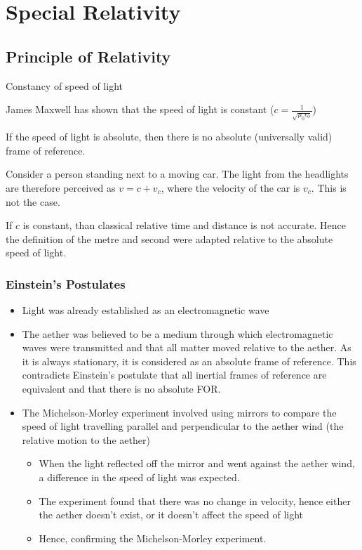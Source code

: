
\chapter{Special Relativity}

\section{Principle of Relativity}

	Constancy of speed of light

	James Maxwell has shown that the speed of light is constant ($c = \frac{1}{\sqrt{\mu_0 \epsilon _0}}$)

	If the speed of light is absolute, then there is no absolute (universally valid) frame of reference.

	Consider a person standing next to a moving car. The light from the headlights are therefore perceived as $v = c + v_c$, where the velocity of the car is $v_c$. This is not the case.

	If $c$ is constant, than classical relative time and distance is not accurate. Hence the definition of the metre and second were adapted relative to the absolute speed of light.

	\subsection{Einstein's Postulates}
	
		\begin{itemize}
			\item Light was already established as an electromagnetic wave
			\item The aether was believed to be a medium through which electromagnetic waves were transmitted and that all matter moved relative to the aether. As it is always stationary, it is considered as an absolute frame of reference. This contradicts Einstein's postulate that all inertial frames of reference are equivalent and that there is no absolute FOR.
			\item The Michelson-Morley experiment involved using mirrors to compare the speed of light travelling parallel and perpendicular to the aether wind (the relative motion to the aether)
				\begin{itemize}
					\item When the light reflected off the mirror and went against the aether wind, a difference in the speed of light was expected.
					\item The experiment found that there was no change in velocity, hence either the aether doesn't exist, or it doesn't affect the speed of light
					\item Hence, confirming the Michelson-Morley experiment.
				\end{itemize}
		\end{itemize}

